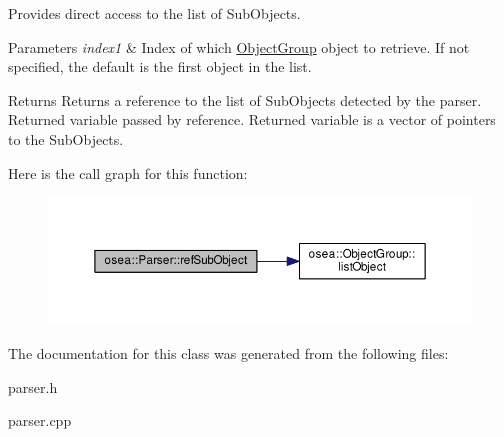 Provides direct access to the list of Sub\-Objects. 


\begin{DoxyParams}{Parameters}
{\em index1} & Index of which \hyperlink{classosea_1_1_object_group}{Object\-Group} object to retrieve. If not specified, the default is the first object in the list. \\
\hline
\end{DoxyParams}
\begin{DoxyReturn}{Returns}
Returns a reference to the list of Sub\-Objects detected by the parser. Returned variable passed by reference. Returned variable is a vector of pointers to the Sub\-Objects. 
\end{DoxyReturn}


Here is the call graph for this function\-:
\nopagebreak
\begin{figure}[H]
\begin{center}
\leavevmode
\includegraphics[width=350pt]{classosea_1_1_parser_a4e0dcef1ae5785c46f2fb6d935090595_cgraph}
\end{center}
\end{figure}




The documentation for this class was generated from the following files\-:\begin{DoxyCompactItemize}
\item 
parser.\-h\item 
parser.\-cpp\end{DoxyCompactItemize}
